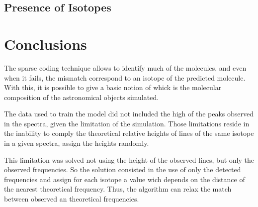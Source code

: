 \documentclass[twocolumn, draft]{emulateapj}
\begin{document}


\subsection{Presence of Isotopes}

\section{Conclusions}
\label{sec:conclusions}

The sparse coding technique allows to identify much of the molecules, and even when it fails, the mismatch correspond to an isotope of the predicted molecule. With this, it is possible to give a basic notion of whick is the molecular composition of the astronomical objects simulated.

The data used to train the model did not included the high of the peaks observed in the spectra, given the limitation of the simulation. Those limitations reside in the inability to comply the theoretical relative heights of lines of the same isotope in a given spectra, assign the heights randomly.

This limitation was solved not using the height of the observed lines, but only the observed frequencies. So the solution consisted in the use of only the detected frequencies and assign for each isotope a value wich depends on the distance of the nearest theoretical frequency. Thus, the algorithm can relax the match between observed an theoretical frequencies.
\end{document}
